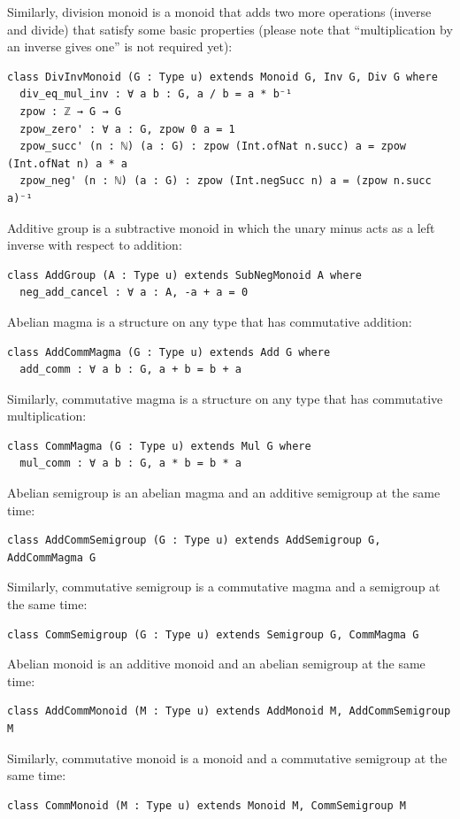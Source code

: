 \documentclass[]{article}
\renewcommand{\.}{\hskip .75pt}
\begin{document}
Similarly, division monoid is a monoid that adds two more operations (inverse and divide)
that satisfy some basic properties (please note that ``multiplication by an inverse gives one''
is not required yet):
\begin{lstlisting}
class DivInvMonoid (G : Type u) extends Monoid G, Inv G, Div G where
  div_eq_mul_inv : ∀ a b : G, a / b = a * b⁻¹ 
  zpow : ℤ → G → G
  zpow_zero' : ∀ a : G, zpow 0 a = 1 
  zpow_succ' (n : ℕ) (a : G) : zpow (Int.ofNat n.succ) a = zpow (Int.ofNat n) a * a
  zpow_neg' (n : ℕ) (a : G) : zpow (Int.negSucc n) a = (zpow n.succ a)⁻¹ 
\end{lstlisting}
Additive group is a subtractive monoid in which the unary minus acts as a left inverse with respect to addition:
\begin{lstlisting}
class AddGroup (A : Type u) extends SubNegMonoid A where
  neg_add_cancel : ∀ a : A, -a + a = 0
\end{lstlisting}
Abelian magma is a structure on any type that has commutative addition:
\begin{lstlisting}
class AddCommMagma (G : Type u) extends Add G where
  add_comm : ∀ a b : G, a + b = b + a
\end{lstlisting}
Similarly, commutative magma is a structure on any type that has commutative multiplication:
\begin{lstlisting}
class CommMagma (G : Type u) extends Mul G where
  mul_comm : ∀ a b : G, a * b = b * a
\end{lstlisting} \pagebreak[2]
Abelian semigroup is an abelian magma and an additive semigroup at the same time:
\begin{lstlisting}
class AddCommSemigroup (G : Type u) extends AddSemigroup G, AddCommMagma G
\end{lstlisting}
Similarly, commutative semigroup is a commutative magma and a semigroup at the same time:
\begin{lstlisting}
class CommSemigroup (G : Type u) extends Semigroup G, CommMagma G
\end{lstlisting}
Abelian monoid is an additive monoid and an abelian semigroup at the same time:
\begin{lstlisting}
class AddCommMonoid (M : Type u) extends AddMonoid M, AddCommSemigroup M
\end{lstlisting}
Similarly, commutative monoid is a monoid and a commutative semigroup at the same time:
\begin{lstlisting}
class CommMonoid (M : Type u) extends Monoid M, CommSemigroup M
\end{lstlisting}
\end{document}
